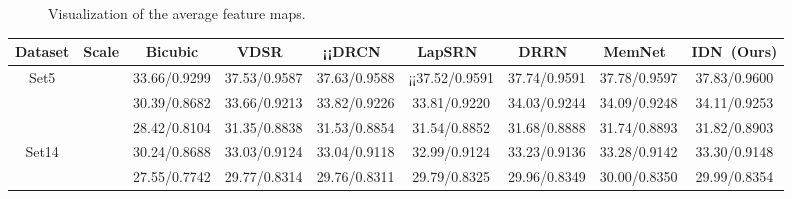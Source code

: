 \documentclass[10pt,twocolumn,letterpaper]{article}
\begin{document}
\begin{figure}[htb]
	\centering
	\hfil
	\caption{Visualization of the average feature maps.}
	\label{network_analyse}
\end{figure}

\begin{table*}[htp]
	\small \begin{center}
		\begin{tabular}{|c|c|c|c|c|c|c|c||c|}
			\hline
			Dataset & Scale & Bicubic & VDSR~\cite{VDSR} &¡¡DRCN~\cite{DRCN} & LapSRN~\cite{LapSRN} & DRRN~\cite{DRRN} & MemNet~\cite{MemNet} & IDN~(Ours) \\
			\hline
			\hline
			\multirow{3}{*}{Set5} &  & 33.66/0.9299 & 37.53/0.9587 & 37.63/0.9588 &¡¡37.52/0.9591 & 37.74/0.9591 & \textcolor[rgb]{0.00,0.07,1.00}{37.78}/\textcolor[rgb]{0.00,0.07,1.00}{0.9597} & \textcolor[rgb]{1.00,0.00,0.00}{37.83}/\textcolor[rgb]{1.00,0.00,0.00}{0.9600} \\
			
			&  & 30.39/0.8682 & 33.66/0.9213 & 33.82/0.9226 & 33.81/0.9220 & 34.03/0.9244 & \textcolor[rgb]{0.00,0.07,1.00}{34.09}/\textcolor[rgb]{0.00,0.07,1.00}{0.9248} & \textcolor[rgb]{1.00,0.00,0.00}{34.11}/\textcolor[rgb]{1.00,0.00,0.00}{0.9253} \\
			
			&  & 28.42/0.8104 & 31.35/0.8838 & 31.53/0.8854 & 31.54/0.8852 & 31.68/0.8888 & \textcolor[rgb]{0.00,0.07,1.00}{31.74}/\textcolor[rgb]{0.00,0.07,1.00}{0.8893} & \textcolor[rgb]{1.00,0.00,0.00}{31.82}/\textcolor[rgb]{1.00,0.00,0.00}{0.8903} \\
			\hline
			\hline
			\multirow{3}{*}{Set14} &  & 30.24/0.8688 & 33.03/0.9124 & 33.04/0.9118 & 32.99/0.9124 & 33.23/0.9136 & \textcolor[rgb]{0.00,0.07,1.00}{33.28}/\textcolor[rgb]{0.00,0.07,1.00}{0.9142} & \textcolor[rgb]{1.00,0.00,0.00}{33.30}/\textcolor[rgb]{1.00,0.00,0.00}{0.9148} \\
			
			&  & 27.55/0.7742 & 29.77/0.8314 & 29.76/0.8311 & 29.79/0.8325 & 29.96/0.8349 & \textcolor[rgb]{1.00,0.00,0.00}{30.00}/\textcolor[rgb]{0.00,0.07,1.00}{0.8350} & \textcolor[rgb]{0.00,0.07,1.00}{29.99}/\textcolor[rgb]{1.00,0.00,0.00}{0.8354} \\
			

\end{tabular}
\end{center}
\end{table*}
\end{document}
